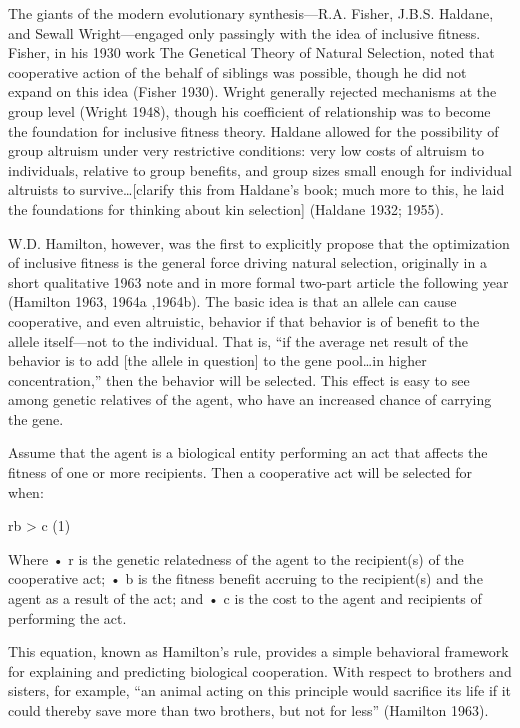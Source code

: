 \documentclass{tufte-book} %
\begin{document}
The giants of the modern evolutionary synthesis—R.A. Fisher, J.B.S. Haldane, and Sewall Wright—engaged only passingly with the idea of inclusive fitness. Fisher, in his 1930 work The Genetical Theory of Natural Selection, noted that cooperative action of the behalf of siblings was possible, though he did not expand on this idea (Fisher 1930). Wright generally rejected mechanisms at the group level (Wright 1948), though his coefficient of relationship was to become the foundation for inclusive fitness theory. Haldane allowed for the possibility of group altruism under very restrictive conditions: very low costs of altruism to individuals, relative to group benefits, and group sizes small enough for individual altruists to survive…[clarify this from Haldane’s book; much more to this, he laid the foundations for thinking about kin selection] (Haldane 1932; 1955). 

W.D. Hamilton, however, was the first to explicitly propose that the optimization of inclusive fitness is the general force driving natural selection, originally in a short qualitative 1963 note and in more formal two-part article the following year (Hamilton 1963, 1964a ,1964b). The basic idea is that an allele can cause cooperative, and even altruistic, behavior if that behavior is of benefit to the allele itself—not to the individual. That is, “if the average net result of the behavior is to add [the allele in question] to the gene pool…in higher concentration,” then the behavior will be selected. This effect is easy to see among genetic relatives of the agent, who have an increased chance of carrying the gene.

Assume that the agent is a biological entity performing an act that affects the fitness of one or more recipients. Then a cooperative act will be selected for when:

					rb > c 					(1)

Where
	•	r is the genetic relatedness of the agent to the recipient(s) of the cooperative act;
	•	b is the fitness benefit accruing to the recipient(s) and the agent as a result of the act; and
	•	c is the cost to the agent and recipients of performing the act. 

This equation, known as Hamilton’s rule, provides a simple behavioral framework for explaining and predicting biological cooperation. With respect to brothers and sisters, for example, “an animal acting on this principle would sacrifice its life if it could thereby save more than two brothers, but not for less” (Hamilton 1963). 
\end{document}
